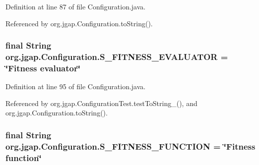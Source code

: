 Definition at line 87 of file Configuration.\-java.



Referenced by org.\-jgap.\-Configuration.\-to\-String().

\hypertarget{classorg_1_1jgap_1_1_configuration_a996ac849b7d29cea50f91e21a37a84c6}{
\subsubsection[{S\-\_\-\-F\-I\-T\-N\-E\-S\-S\-\_\-\-E\-V\-A\-L\-U\-A\-T\-O\-R}]{\setlength{\rightskip}{0pt plus 5cm}final String org.\-jgap.\-Configuration.\-S\-\_\-\-F\-I\-T\-N\-E\-S\-S\-\_\-\-E\-V\-A\-L\-U\-A\-T\-O\-R = \char`\"{}Fitness evaluator\char`\"{}\hspace{0.3cm}{\ttfamily [static]}}}\label{classorg_1_1jgap_1_1_configuration_a996ac849b7d29cea50f91e21a37a84c6}


Definition at line 95 of file Configuration.\-java.



Referenced by org.\-jgap.\-Configuration\-Test.\-test\-To\-String\-\_(), and org.\-jgap.\-Configuration.\-to\-String().

\hypertarget{classorg_1_1jgap_1_1_configuration_a29a46661270aa65be2eceb435e319043}{
\subsubsection[{S\-\_\-\-F\-I\-T\-N\-E\-S\-S\-\_\-\-F\-U\-N\-C\-T\-I\-O\-N}]{\setlength{\rightskip}{0pt plus 5cm}final String org.\-jgap.\-Configuration.\-S\-\_\-\-F\-I\-T\-N\-E\-S\-S\-\_\-\-F\-U\-N\-C\-T\-I\-O\-N = \char`\"{}Fitness function\char`\"{}\hspace{0.3cm}{\ttfamily [static]}}}\label{classorg_1_1jgap_1_1_configuration_a29a46661270aa65be2eceb435e319043}


